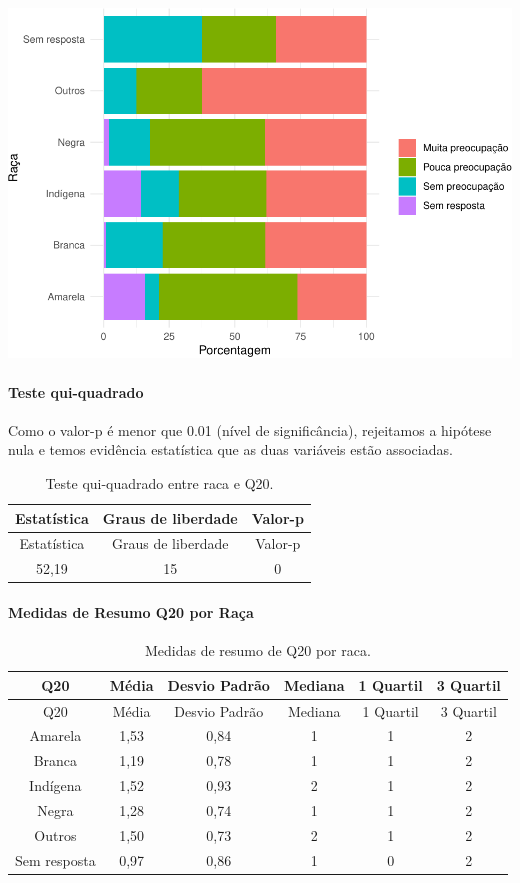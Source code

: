\documentclass[]{article}
\let\oldparagraph\paragraph
\renewcommand{\paragraph}[1]{\oldparagraph{#1}\mbox{}}
\begin{document}
\begin{center}\includegraphics[width=0.75\linewidth]{relatorio_covid19_files/figure-latex/unnamed-chunk-398-1} \end{center}

\hypertarget{teste-qui-quadrado-35}{%
\paragraph{Teste qui-quadrado}\label{teste-qui-quadrado-35}}

Como o valor-p é menor que 0.01 (nível de significância), rejeitamos a hipótese nula e temos evidência estatística que as duas variáveis estão associadas.

\begin{longtable}[]{@{}ccc@{}}
\caption{\label{tab:unnamed-chunk-400}Teste qui-quadrado entre raca e Q20.}\tabularnewline
\toprule
Estatística & Graus de liberdade & Valor-p\tabularnewline
\midrule
\endfirsthead
\toprule
Estatística & Graus de liberdade & Valor-p\tabularnewline
\midrule
\endhead
52,19 & 15 & 0\tabularnewline
\bottomrule
\end{longtable}

\cleardoublepage

\hypertarget{medidas-de-resumo-q20-por-rauxe7a}{%
\paragraph{Medidas de Resumo Q20 por Raça}\label{medidas-de-resumo-q20-por-rauxe7a}}

\begin{longtable}[]{@{}cccccc@{}}
\caption{\label{tab:unnamed-chunk-401}Medidas de resumo de Q20 por raca.}\tabularnewline
\toprule
Q20 & Média & Desvio Padrão & Mediana & 1 Quartil & 3 Quartil\tabularnewline
\midrule
\endfirsthead
\toprule
Q20 & Média & Desvio Padrão & Mediana & 1 Quartil & 3 Quartil\tabularnewline
\midrule
\endhead
Amarela & 1,53 & 0,84 & 1 & 1 & 2\tabularnewline
Branca & 1,19 & 0,78 & 1 & 1 & 2\tabularnewline
Indígena & 1,52 & 0,93 & 2 & 1 & 2\tabularnewline
Negra & 1,28 & 0,74 & 1 & 1 & 2\tabularnewline
Outros & 1,50 & 0,73 & 2 & 1 & 2\tabularnewline
Sem resposta & 0,97 & 0,86 & 1 & 0 & 2\tabularnewline
\bottomrule
\end{longtable}
\end{document}
